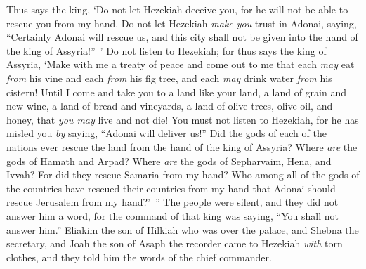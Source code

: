 \begin{biblechapter}
\verse Thus says the king, ‘Do not let Hezekiah deceive you, for he will not be able to rescue you from my hand.
\verse Do not let Hezekiah \textit{make you} trust in Adonai, saying, “Certainly Adonai will rescue us, and this city shall not be given into the hand of the king of Assyria!” ’
\verse Do not listen to Hezekiah; for thus says the king of Assyria, ‘Make with me a treaty of peace and come out to me that each \textit{may} eat \textit{from} his vine and each \textit{from} his fig tree, and each \textit{may} drink water \textit{from} his cistern!
\verse Until I come and take you to a land like your land, a land of grain and new wine, a land of bread and vineyards, a land of olive trees, olive oil, and honey, that \textit{you may} live and not die! You must not listen to Hezekiah, for he has misled you \textit{by} saying, “Adonai will deliver us!”
\verse Did the gods of each of the nations ever rescue the land from the hand of the king of Assyria?
\verse Where \textit{are} the gods of Hamath and Arpad? Where \textit{are} the gods of Sepharvaim, Hena, and Ivvah? For did they rescue Samaria from my hand?
\verse Who among all of the gods of the countries have rescued their countries from my hand that Adonai should rescue Jerusalem from my hand?’ ”
\verse The people were silent, and they did not answer him a word, for the command of that king was saying, “You shall not answer him.”
\verse Eliakim the son of Hilkiah who was over the palace, and Shebna the secretary, and Joah the son of Asaph the recorder came to Hezekiah \textit{with} torn clothes, and they told him the words of the chief commander.
\end{biblechapter}

